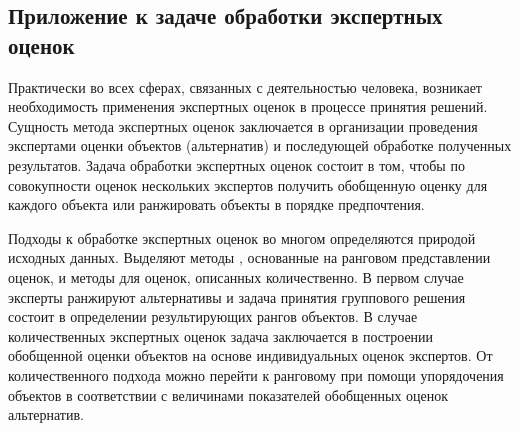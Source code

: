 \documentclass[specialist,
               substylefile = spbu.rtx,
               subf,href,colorlinks=true, 12pt]{disser}
\theoremstyle{definition}
\begin{document}
\subsection{Приложение к задаче обработки экспертных оценок}\label{sec:PRO}
Практически во всех сферах, связанных с деятельностью человека, возникает необходимость применения экспертных оценок в процессе принятия решений.  
Сущность метода экспертных оценок заключается в организации проведения экспертами оценки объектов (альтернатив) и последующей обработке полученных результатов. %
Задача обработки экспертных оценок состоит в том, чтобы по совокупности оценок нескольких экспертов получить обобщенную оценку для каждого объекта или ранжировать объекты в порядке предпочтения.

Подходы к обработке экспертных оценок во многом определяются природой исходных данных.  
Выделяют методы \cite{Tocenko2002Methods,Litvak1996Expert}, основанные на ранговом представлении оценок, и методы для оценок, описанных количественно. В первом случае эксперты ранжируют альтернативы и задача принятия группового решения состоит в определении результирующих рангов объектов.
В случае количественных экспертных оценок задача заключается в построении обобщенной оценки объектов на основе индивидуальных оценок экспертов. 
От количественного подхода можно перейти к ранговому при помощи упорядочения объектов в соответствии с величинами показателей обобщенных оценок альтернатив.

\end{document}
